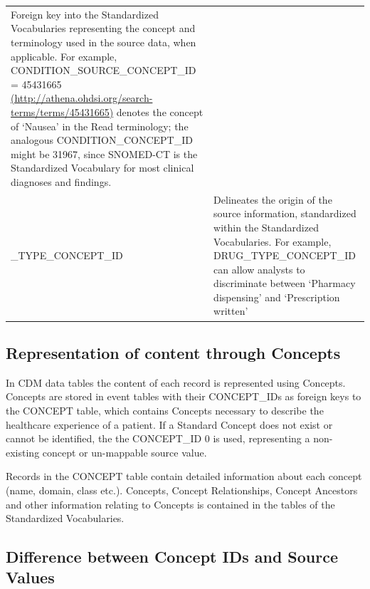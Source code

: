 \documentclass[]{book}
\begin{document}
\begin{longtable}[]{@{}ll@{}}
\begin{minipage}[t]{0.70\columnwidth}
Foreign key into the Standardized Vocabularies representing the concept
and terminology used in the source data, when applicable. For example,
CONDITION\_SOURCE\_CONCEPT\_ID = 45431665
\href{http://athena.ohdsi.org/search-terms/terms/45431665}{(http://athena.ohdsi.org/search-terms/terms/45431665)}
denotes the concept of `Nausea' in the Read terminology; the analogous
CONDITION\_CONCEPT\_ID might be 31967, since SNOMED-CT is the
Standardized Vocabulary for most clinical diagnoses and findings.\strut
\end{minipage}\tabularnewline
\begin{minipage}[t]{0.24\columnwidth}\raggedright\strut
\_TYPE\_CONCEPT\_ID\strut
\end{minipage} & \begin{minipage}[t]{0.70\columnwidth}\raggedright\strut
Delineates the origin of the source information, standardized within the
Standardized Vocabularies. For example, DRUG\_TYPE\_CONCEPT\_ID can
allow analysts to discriminate between `Pharmacy dispensing' and
`Prescription written'\strut
\end{minipage}\tabularnewline
\bottomrule
\end{longtable}

\subsection{Representation of content through
Concepts}\label{representation-of-content-through-concepts}

In CDM data tables the content of each record is represented using
Concepts. Concepts are stored in event tables with their CONCEPT\_IDs as
foreign keys to the CONCEPT table, which contains Concepts necessary to
describe the healthcare experience of a patient. If a Standard Concept
does not exist or cannot be identified, the the CONCEPT\_ID 0 is used,
representing a non-existing concept or un-mappable source value.

Records in the CONCEPT table contain detailed information about each
concept (name, domain, class etc.). Concepts, Concept Relationships,
Concept Ancestors and other information relating to Concepts is
contained in the tables of the Standardized Vocabularies.

\subsection{Difference between Concept IDs and Source
Values}\label{difference-between-concept-ids-and-source-values}
\end{document}
